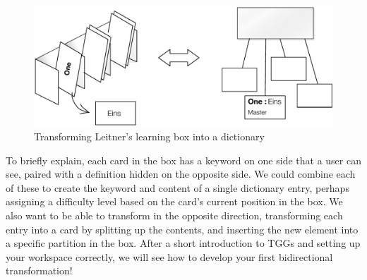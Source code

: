 \begin{figure}[htbp]
\begin{center}
  \includegraphics[width=\textwidth]{TGGTransformationExample.pdf}
  \caption{Transforming Leitner's learning box into a dictionary}
  \label{fig:transformIdea}
\end{center}
\end{figure}

\newpage

To briefly explain, each card in the box has a keyword on one side that a user can see, paired with a definition hidden on the opposite side. We could combine
each of these to create the keyword and content of a single dictionary entry, perhaps assigning a difficulty level based on the card's current position in the
box. We also want to be able to transform in the opposite direction, transforming each entry into a card by splitting up the contents, and inserting the new
element into a specific partition in the box. After a short introduction to TGGs and setting up your workspace correctly, we will see how to develop
your first bidirectional transformation!

